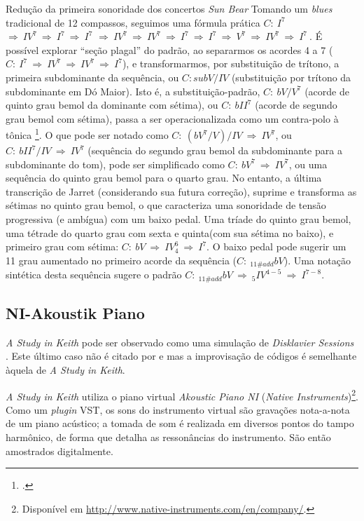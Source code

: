 \begin{example}{Redução da primeira sonoridade dos concertos \emph{Sun Bear}}
Tomando um \emph{blues} tradicional de 12 compassos, seguimos uma fórmula prática $C:~I^7~$ $\Rightarrow~IV^7~\Rightarrow~I^7~\Rightarrow~I^7$ $\Rightarrow~IV^7~\Rightarrow~IV^7~\Rightarrow~I^7~\Rightarrow~I^7~\Rightarrow~V^7~\Rightarrow~IV^7~\Rightarrow~I^7~$. É possível explorar ``seção plagal'' do padrão, ao separarmos os acordes 4 a 7 ($C:~I^7~\Rightarrow~IV^7~\Rightarrow~IV^7~\Rightarrow~I^7$), e transformarmos, por substituição de trítono, a primeira subdominante da sequência, ou $C: subV/IV$ (substituição por trítono da subdominante em Dó Maior). Isto é, a substituição-padrão, $C:~bV/V^7$ (acorde de quinto grau bemol da dominante com sétima), ou $C:~bII^7$ (acorde de segundo grau bemol com sétima), passa a ser operacionalizada como um contra-polo à tônica \footnote{.}.  O que pode ser notado como $C:~(bV^7/V)/IV~\Rightarrow~IV^7$, ou $C:~bII^7/IV~\Rightarrow~IV^7$ (sequência do segundo grau bemol da subdominante para a subdominante do tom), pode ser simplificado como $C:~bV^7~\Rightarrow~IV^7$, ou uma sequência do quinto grau bemol para o quarto grau.  No entanto, a última transcrição de Jarret (considerando sua futura correção), suprime e transforma as sétimas no quinto grau bemol, o que caracteriza uma sonoridade de tensão progressiva (e ambígua) com um baixo pedal. Uma tríade do quinto grau bemol, uma tétrade do quarto grau com sexta e quinta(com sua sétima no baixo), e primeiro grau com sétima:  $C:~bV~\Rightarrow~IV^6_{4}~\Rightarrow~I^7$. O baixo pedal pode sugerir um 11 grau aumentado no primeiro acorde da sequência ($C:~_{11\#add}bV$). Uma notação sintética desta sequência sugere o padrão  $C:~_{11\#add}bV~\Rightarrow~_{5}IV^{4-5}~\Rightarrow~I^{7-8}$.
\centering{}
\end{example}


\subsection{NI-Akoustik Piano}\label{sec:NI}

\emph{A Study in Keith} pode ser observado como uma simulação de \emph{Disklavier Sessions} . Este último caso não é citado por   e  mas a improvisação de códigos é semelhante àquela de \emph{A Study in Keith}.

\emph{A Study in Keith} utiliza o piano virtual \emph{Akoustic Piano NI} (\emph{Native Instruments})\footnote{Disponível em \url{http://www.native-instruments.com/en/company/}.}. Como um \emph{plugin} VST, os sons do instrumento virtual são gravações nota-a-nota de um piano acústico; a tomada de som é realizada em diversos pontos do tampo harmônico, de forma que detalha as ressonâncias do instrumento. São então amostrados digitalmente.

